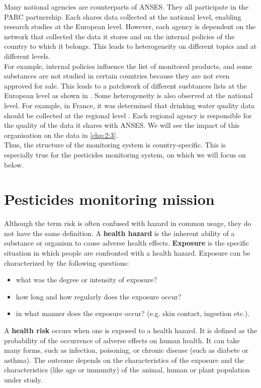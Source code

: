 Many national agencies are counterparts of ANSES. They all participate in the PARC partnership. Each shares data collected at the national level, enabling research studies at the European level. However, each agency is dependent on the network that collected the data it stores and on the internal policies of the country to which it belongs. This leads to heterogeneity on different topics and at different levels. \\
For example, internal policies influence the list of monitored products, and some substances are not studied in certain countries because they are not even approved for sale. This leads to a patchwork of different susbtances lists at the European level as shown in \cite{Baran2022}. Some heterogeneity is also observed at the national level. For example, in France, it was determined that drinking water quality data should be collected at the regional level \cite{Baran2022}. Each regional agency is responsible for the quality of the data it shares with ANSES. We will see the impact of this organisation on the data in \ref{chp:2:3}. \\
Thus, the structure of the monitoring system is country-specific. This is especially true for the pesticides monitoring system, on which we will focus on below.

\section{Pesticides monitoring mission}\label{chp:2:2}

Although the term risk is often confused with hazard in common usage, they do not have the same definition. A \textbf{health hazard} is the inherent ability of a substance or organism to cause adverse health effects. \textbf{Exposure} is the specific situation in which people are confronted with a health hazard. Exposure can be characterized by the following questions:
\begin{itemize}
\item what was the degree or intensity of exposure?
\item how long and how regularly does the exposure occur? 
\item in what manner does the exposure occur? (e.g. skin contact, ingestion etc.). 
\end{itemize}
A \textbf{health risk} occurs when one is exposed to a health hazard. It is defined as the probability of the occurrence of adverse effects on human health. It can take many forms, such as infection, poisoning, or chronic disease (such as diabete or asthma). The outcome depends on the characteristics of the exposure and the characteristics (like age or immunity) of the animal, human or plant population under study.

